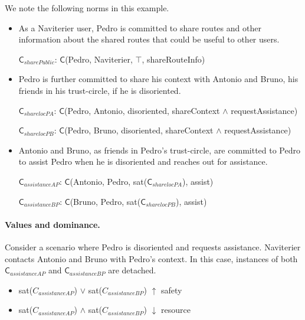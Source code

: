 \documentclass[11pt,          %
               phd,           %
               onehalfspacing %
               ]{ncsuthesis}
\newcommand{\msf}{\mathsf}
\newcommand{\C}{\msf{C}}
\newcommand{\navigationapp}{Naviterier\xspace}
\newcommand{\nsa}[1]{\textcolor{green!50!black}{NSA:~~#1}}
\begin{document}
We note the following norms in this example. 

\begin{itemize}
\item As a \navigationapp user, Pedro is committed to share routes and
other information about the shared routes that could be useful to other
users.

$\C_{sharePublic}$: $\C$(Pedro, \navigationapp, $\top$, shareRouteInfo)

\item Pedro is further committed to share his context with Antonio and
Bruno, his friends in his trust-circle, if he is disoriented.

$\C_{sharelocPA}$: $\C$(Pedro, Antonio, disoriented, shareContext
$\land$ requestAssistance)

$\C_{sharelocPB}$: $\C$(Pedro, Bruno, disoriented, shareContext $\land$
requestAssistance)

\item Antonio and Bruno, as friends in Pedro's trust-circle,
are committed to Pedro to assist Pedro when he is disoriented and
reaches out for assistance.

 $\C_{assistanceAP}$: $\C$(Antonio, Pedro, sat($\C_{sharelocPA}$), assist)

$\C_{assistanceBP}$: $\C$(Bruno, Pedro, sat($\C_{sharelocPB}$), assist)

\end{itemize}

\paragraph*{Values and dominance.}

Consider a scenario where Pedro is disoriented and requests assistance.
\navigationapp contacts Antonio and Bruno with Pedro's context. In this
case, instances of both $\C_{assistanceAP}$ and $\C_{assistanceBP}$ are
detached.

\begin{itemize}

\item sat($C_{assistanceAP}$) $\lor$ sat($C_{assistanceBP}$) $\uparrow$ safety
\item sat($C_{assistanceAP}$) $\land$ sat($C_{assistanceBP}$) $\downarrow$ resource 

\end{itemize}
\end{document}
